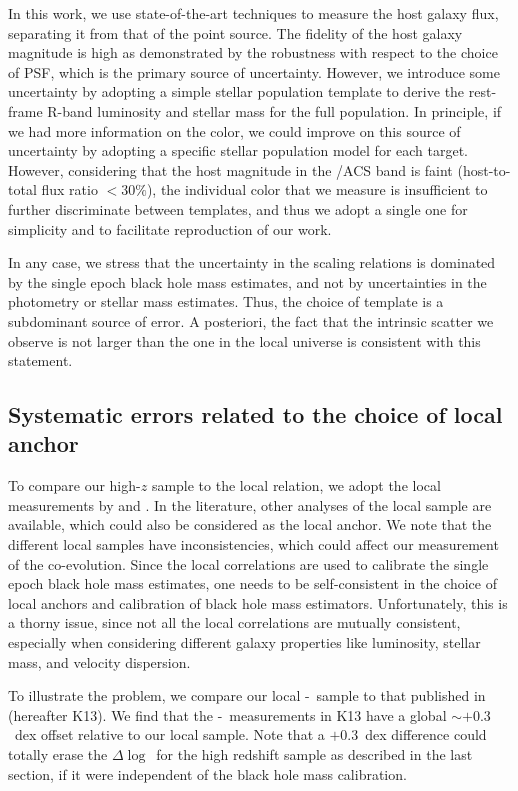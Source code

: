 \documentclass[apj]{emulateapj}
\begin{document}
In this work, we use state-of-the-art techniques to measure the host galaxy flux, separating it from that of the point source. The fidelity of the host galaxy magnitude is high as demonstrated by the robustness with respect to the choice of PSF, which is the primary source of uncertainty. However, we introduce some uncertainty by adopting a simple stellar population template to derive the rest-frame R-band luminosity and stellar mass for the full population. In principle, if we had more information on the color, we could improve on this source of uncertainty by adopting a specific stellar population model for each target. However, considering that the host magnitude in the \hst/ACS band is faint (host-to-total flux ratio $< 30\%$), the individual color that we measure is insufficient to further discriminate between templates, and thus we adopt a single one for simplicity and to facilitate reproduction of our work.

In any case, we stress that the uncertainty in the scaling relations is dominated by the single epoch black hole mass estimates, and not by uncertainties in the photometry or stellar mass estimates. Thus, the choice of template is a subdominant source of error. A posteriori, the fact that the intrinsic scatter we observe is not larger than the one in the local universe is consistent with this statement.

\subsection{Systematic errors related to the choice of local anchor}
\label{sec:local_sys}

To compare our high-$z$ sample to the local relation, we adopt the local measurements by \citet{Ben++10, Bennert++2011} and  \citet{H+R04}. In the literature, other analyses of the local sample are available, which could also be considered as the local anchor. We note that the different local samples have inconsistencies, which could affect our measurement of the co-evolution. Since the local correlations are used to calibrate the single epoch black hole mass estimates, one needs to be self-consistent in the choice of local anchors and calibration of black hole mass estimators. Unfortunately, this is a thorny issue, since not all the local correlations are mutually consistent, especially when considering different galaxy properties like luminosity, stellar mass, and velocity dispersion.

To illustrate the problem, we compare our local \mbh-\smass\ sample to that published in \citet{Kormendy13} (hereafter K13). We find that the \mbh-\smass\ measurements in K13 have a global $\sim+0.3$~dex offset relative to our local sample. Note that a $+0.3$~dex difference could totally erase the $\Delta\log$\mbh\ for the high redshift sample as described in the last section, if it were independent of the black hole mass calibration.
\end{document}
